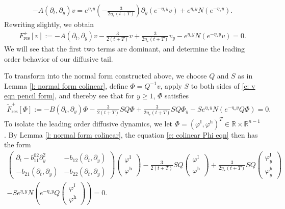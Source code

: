 \documentclass[11pt]{article}
\newcommand{\R}{\mathbb{R}}
\renewcommand{\phi}{\varphi}
\numberwithin{equation}{section}
\numberwithin{prop}{section}
\newcommand{\phih}{\phi^\mathrm{h}}
\newcommand{\phiI}{\phi^\mathrm{I}}
\begin{document}
\begin{align}
- A(\partial_t, \partial_y)  v = e^{\eta_* y} \left( - \frac{3}{2 \eta_* (t+T)} \right) \partial_y (e^{-\eta_* y} v) + e^{\eta_* y} N(e^{-\eta_*y}). 
\end{align}
Rewriting slightly, we obtain 
\begin{align}
F_\mathrm{res}^+ [v] := -A(\partial_t, \partial_y) v - \frac{3}{2 (t+T)} v +  \frac{3}{2 \eta_* (t+T)} v_y - e^{\eta_* y} N(e^{-\eta_* y} v) = 0. \label{e: v eqn pencil form}
\end{align}
We will see that the first two terms are dominant, and determine the leading order behavior of our diffusive tail. 

To transform into the normal form constructed above, we choose $Q$ and $S$ as in Lemma \ref{l: normal form colinear}, define $\Phi = Q^{-1} v$, apply $S$ to both sides of \eqref{e: v eqn pencil form}, and thereby see that for $y \geq 1$, $\Phi$ satisfies
\begin{align}
\tilde{F}_\mathrm{res}^+ [\Phi] := - B(\partial_t, \partial_y) \Phi 
 - \frac{3}{2 (t+T)} SQ \Phi + \frac{3}{2 \eta_* (t+T)} SQ \Phi_y - S e^{\eta_* y} N(e^{-\eta_* y} Q\Phi) = 0. \label{e: colinear Phi eqn}
\end{align}
To isolate the leading order diffusive dynamics, we let $\Phi = (\phi^\mathrm{I}, \phih)^T \in \R \times \R^{n-1}$. By Lemma \ref{l: normal form colinear}, the equation \eqref{e: colinear Phi eqn} then has the form
\begin{multline}
\begin{pmatrix}
\partial_t - b_{11}^{02} \partial_y^2 & -b_{12} (\partial_t, \partial_y) \\
-b_{21} (\partial_t, \partial_y) & -b_{22} (\partial_t, \partial_y) 
\end{pmatrix}
\begin{pmatrix}
\phiI \\ \phi^\mathrm{h} 
\end{pmatrix}
- \frac{3}{2 (t+T)} SQ \begin{pmatrix} \phiI \\ \phi^\mathrm{h} \end{pmatrix} + \frac{3}{2 \eta_* (t+T)} SQ \begin{pmatrix}\phiI_y \\ \phi^\mathrm{h}_y \end{pmatrix} \\ - S e^{\eta_*y} N \left( e^{-\eta_*y} Q \begin{pmatrix} \phiI \\ \phi^\mathrm{h} \end{pmatrix}  \right) = 0. \label{e: colinear system}
\end{multline}
\end{document}
